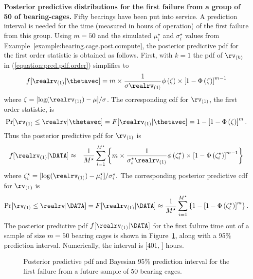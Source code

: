 \begin{example}
{\bf Posterior predictive distributions for the first failure from 
a group of 50 of bearing-cages.}
Fifty bearings have been put into service.  A prediction interval is
needed for the time (measured in hours of operation) of the first
failure from this group. Using $m=50$ and the simulated
$\mu_{i}^{\star}$ and $\sigma_{i}^{\star}$ values from
Example~\ref{example:bearing.cage.post.compute}, the posterior
predictive pdf for the first order statistic is obtained as
follows. 
First, with
$k=1$ the pdf of
$\rv_{(k)}$ in (\ref{equation:pred.pdf.order}) simplifies to
\begin{displaymath}
f[\realrv_{(1)}|\thetavec]=
	m \times \frac{1}{\sigma \realrv_{(1)}} 
	\phi\left (\zeta\right )\times
	\left [1-\Phi\left (\zeta\right )\right ]^{m-1}
\end{displaymath}
where $\zeta=[\log(\realrv_{(1)})-\mu]/\sigma$.
The corresponding cdf for $\rv_{(1)}$, the first order statistic, is
\begin{displaymath}
\Pr[\rv_{(1)} \le \realrv |\thetavec]=F[\realrv_{(1)}|\thetavec] =
1-\left [1-\Phi\left (\zeta\right )\right ]^{m}.
\end{displaymath}
Thus the  posterior predictive pdf for $\rv_{(1)}$ is
\begin{eqnarray*}
f[\realrv_{(1)} |\DATA] & \approx & \frac{1}{M^{\star}} \sum_{i=1}^{M^{\star}}
\left \{m \times 
\frac{1}{\sigma_{i}^{\star} \realrv_{(1)}} \phi\left (\zeta^{\star}_{i}\right )
\times
\left [1-\Phi\left (\zeta^{\star}_{i}\right )\right ]^{m-1}\right \}
\end{eqnarray*}
where
$
\zeta^{\star}_{i}=[\log(\realrv_{(1)})-\mu_{i}^{\star}]/
      \sigma_{i}^{\star}.
$
The corresponding posterior predictive cdf for $\rv_{(1)}$ is
\begin{displaymath}
\Pr[\rv_{(1)} \le \realrv|\DATA]=F[\realrv_{(1)}|\DATA]  \approx  \frac{1}{M^{\star}} \sum_{i=1}^{M^{\star}}
\left \{1-\left [1-\Phi\left (\zeta^{\star}_{i}\right )\right ]^{m}\right \}.
\end{displaymath}
The posterior predictive pdf $f[\realrv_{(1)} |\DATA]$ for the first
failure time out of a sample of size $m=50$ bearing cages is shown
in Figure~\ref{figure:pred.first.fail.bcage.ps}, along with a 95\%
prediction interval. Numerically, the interval is [401, ]
hours.
\begin{figure}
\caption{Posterior predictive pdf and Bayesian 95\% 
prediction interval for the first failure from a future sample of 50
bearing cages.}
\label{figure:pred.first.fail.bcage.ps}
\end{figure}
\end{example}


